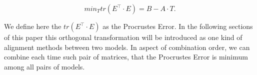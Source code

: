 	\begin{equation}
		min_T tr(E^\intercal\cdot E) = B-A\cdot T.
	\end{equation}

	We define here the $tr(E^\intercal \cdot E)$ as the Procrustes Error. In the following sections of this paper this orthogonal transformation will be introduced as one kind of alignment methods between two models. In aspect of combination order, we can combine each time such pair of matrices, that the Procrustes Error is minimum among all pairs of models.